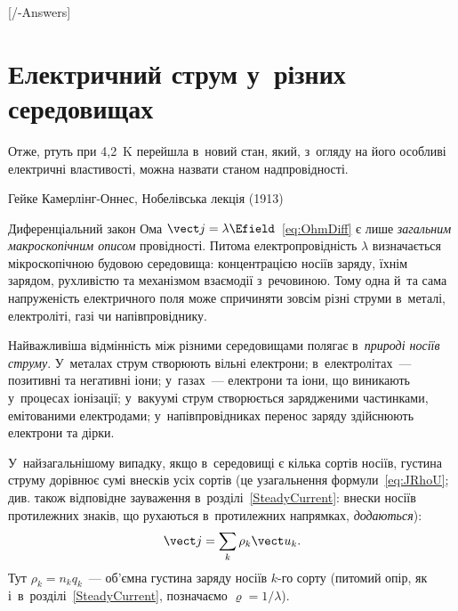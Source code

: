 
[\currfilebase/\currfilebase-Answers]
\chapter{Електричний струм у~різних середовищах}\label{\currfilebase}\hypertarget{\currfilebase}{}
\graphicspath{{\currfilebase/Pictures}}

\epigraph{Отже, ртуть при 4{,}2~K перейшла в~новий стан, який, з~огляду на його особливі
електричні властивості, можна назвати станом надпровідності.}{Гейке Камерлінг-Оннес, Нобелівська
лекція (1913)}

Диференціальний закон Ома $\vect j = \lambda \Efield$~\eqref{eq:OhmDiff} є лише
\emph{загальним макроскопічним описом} провідності. Питома електропровідність $\lambda$
визначається мікроскопічною будовою середовища: концентрацією носіїв заряду, їхнім
зарядом, рухливістю та механізмом взаємодії з~речовиною. Тому одна й~та сама напруженість
електричного поля може спричиняти зовсім різні струми в~металі, електроліті, газі чи
напівпровіднику.

Найважливіша відмінність між різними середовищами полягає в~\emph{природі носіїв струму}.
У~металах струм створюють вільні електрони; в~електролітах~--- позитивні та негативні
іони; у~газах~--- електрони та іони, що виникають у~процесах іонізації; у~вакуумі струм
створюється зарядженими частинками, емітованими електродами; у~напівпровідниках перенос
заряду здійснюють електрони та дірки.

У~найзагальнішому випадку, якщо в~середовищі є кілька сортів носіїв, густина струму
дорівнює сумі внесків усіх сортів (це узагальнення формули~\eqref{eq:JRhoU}; див. також
відповідне зауваження в~розділі~\ref{SteadyCurrent}: внески носіїв протилежних знаків, що
рухаються в~протилежних напрямках, \emph{додаються}):
\begin{equation}\label{eq:GeneralCurrentMedia}
	\vect j = \sum_k \rho_k\vect u_k.
\end{equation}
Тут $\rho_k=n_kq_k$~--- об'ємна густина заряду носіїв $k$-го сорту (питомий опір, як
і~в~розділі~\ref{SteadyCurrent}, позначаємо $\varrho=1/\lambda$).

